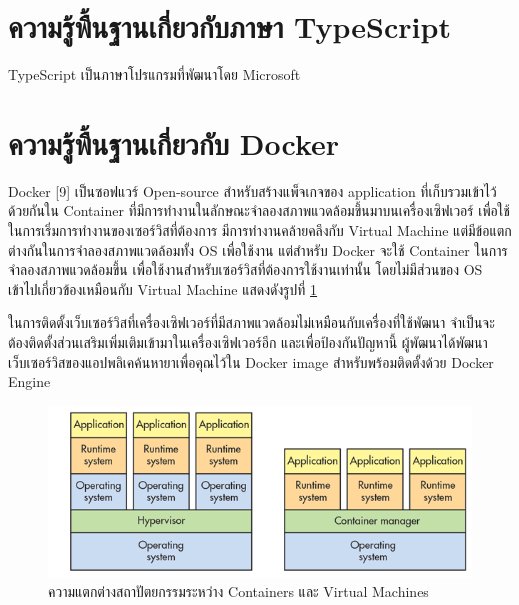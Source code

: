 \section{ความรู้พื้นฐานเกี่ยวกับภาษา TypeScript}
	TypeScript เป็นภาษาโปรแกรมที่พัฒนาโดย Microsoft



\section{ความรู้พื้นฐานเกี่ยวกับ Docker }
	Docker [9] เป็นซอฟแวร์ Open-source สำหรับสร้างแพ็จเกจของ application ที่เก็บรวมเข้าไว้ด้วยกันใน Container 
	ที่มีการทำงานในลักษณะจำลองสภาพแวดล้อมขึ้นมาบนเครื่องเซิฟเวอร์ 
	เพื่อใช้ในการเริ่มการทำงานของเซอร์วิสที่ต้องการ 
	มีการทำงานคล้ายคลึงกับ Virtual Machine 
	แต่มีข้อแตกต่างกันในการจำลองสภาพแวดล้อมทั้ง OS 
	เพื่อใช้งาน แต่สำหรับ Docker จะใช้ Container ในการจำลองสภาพแวดล้อมขึ้น 
	เพื่อใช้งานสำหรับเซอร์วิสที่ต้องการใช้งานเท่านั้น 
	โดยไม่มีส่วนของ OS เข้าไปเกี่ยวข้องเหมือนกับ Virtual Machine แสดงดังรูปที่ \ref{Fig:containers_vs_VM}
	
	ในการติดตั้งเว็บเซอร์วิสที่เครื่องเซิฟเวอร์ที่มีสภาพแวดล้อมไม่เหมือนกับเครื่องที่ใช้พัฒนา 
	จำเป็นจะต้องติดตั้งส่วนเสริมเพิ่มเติมเข้ามาในเครื่องเซิฟเวอร์อีก และเพื่อป้องกันปัญหานี้ 
	ผู้พัฒนาได้พัฒนาเว็บเซอร์วิสของแอปพลิเคค้นหายาเพื่อคุณไว้ใน 
	Docker image สำหรับพร้อมติดตั้งด้วย Docker Engine  

	\begin{figure}
		\includegraphics[width=\columnwidth]{Figures/2/containers_vs_VM}
		\caption{ความแตกต่างสถาปัตยกรรมระหว่าง Containers และ Virtual Machines}
		\label{Fig:containers_vs_VM}
	\end{figure}

